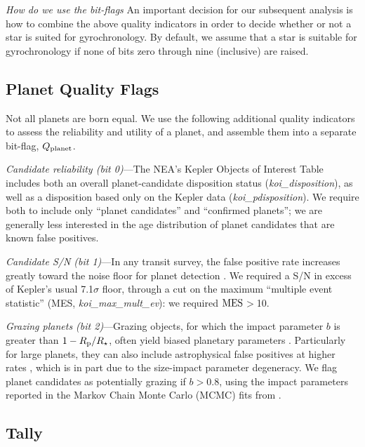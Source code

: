 \documentclass[11pt,twocolumn,tighten]{aastex63}
\begin{document}
{\it How do we use the bit-flags}
An important decision for our subsequent analysis is how to combine
the above quality indicators in order to decide whether or not a star is suited for
gyrochronology.  By default, we assume that a star is suitable for
gyrochronology if none of bits zero through nine (inclusive) are
raised.


\subsection{Planet Quality Flags}
\label{subsec:plflags}
Not all planets are born equal.
We use the following additional quality indicators to assess 
the reliability and utility of a planet, and assemble them into a separate bit-flag,
$Q_{\rm planet}$.

{\it Candidate reliability (bit 0)}---The NEA's Kepler Objects of Interest Table
includes both an overall planet-candidate disposition status
({\it koi\_disposition}), as well as a disposition based only on the Kepler
data ({\it koi\_pdisposition}).
We require both to include only
``planet candidates'' and ``confirmed planets''; we are generally less interested
in the age distribution of planet candidates that are known false positives.

{\it Candidate S/N (bit 1)}---In any transit survey, the false positive rate increases
greatly toward the noise floor for planet detection \citep[e.g.][]{2002ApJ...564..495J}.  We
required a S/N in excess of Kepler's usual 7.1$\sigma$ floor, through a cut on the
maximum
``multiple event statistic'' (MES, {\it koi\_max\_mult\_ev}): we required ${\rm MES}$$>$10.

{\it Grazing planets (bit 2)}---Grazing objects, for which the impact
parameter $b$ is greater than $1-R_{\rm p}/R_\star$,
often yield biased planetary parameters
\citep[e.g.][]{2022AJ....163..111G}.
Particularly for large planets, they can also include
astrophysical false positives at higher rates \citep{2016ApJ...822...86M}, which is
in part due to the size-impact parameter degeneracy.
We flag planet candidates as potentially grazing if $b>0.8$, 
using the impact parameters reported in the Markov Chain
Monte Carlo (MCMC) fits from \citet{Thompson_2018}.


\subsection{Tally}
\label{subsec:tally}
\end{document}
